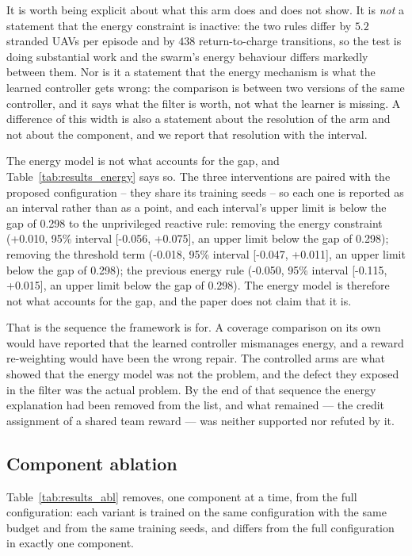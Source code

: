 \documentclass[conference]{IEEEtran}
\begin{document}
It is worth being explicit about what this arm does and does not show.
It is \emph{not} a statement that the
energy constraint is inactive: the two rules differ by $5.2$
stranded UAVs per episode and by $438$ return-to-charge
transitions, so the test is doing substantial work and the swarm's energy
behaviour differs markedly between them.  Nor is it a statement that the
energy mechanism is what the learned controller gets wrong: the
comparison is between two versions of the same controller, and it says
what the filter is worth, not what the learner is missing.  A
difference of this width is also a statement about the resolution of the
arm and not about the component, and we report that resolution with the
interval.

The energy model is not what accounts for the gap, and Table~\ref{tab:results_energy} says so.  The three interventions are paired with the proposed configuration -- they share its training seeds -- so each one is reported as an interval rather than as a point, and each interval's upper limit is below the gap of 0.298 to the unprivileged reactive rule: removing the energy constraint (+0.010, 95\% interval [-0.056, +0.075], an upper limit below the gap of 0.298); removing the threshold term (-0.018, 95\% interval [-0.047, +0.011], an upper limit below the gap of 0.298); the previous energy rule (-0.050, 95\% interval [-0.115, +0.015], an upper limit below the gap of 0.298).  The energy model is therefore not what accounts for the gap, and the paper does not claim that it is.

That is the sequence the framework is for.  A coverage comparison on its
own would have reported that the learned controller mismanages energy, and
a reward re-weighting would have been the wrong repair.  The controlled
arms are what showed that the energy model was not the problem, and the
defect they exposed in the filter was the actual problem.  By the end of
that sequence the energy explanation had been removed from the list, and
what remained --- the credit assignment of a shared team reward --- was
neither supported nor refuted by it.

\subsection{Component ablation}
\label{sec:results_abl}

Table~\ref{tab:results_abl} removes, one component at a time, from the
full configuration: each variant is trained on the same configuration with
the same budget and from the same training seeds, and differs from the full
configuration in exactly one component.
\end{document}
